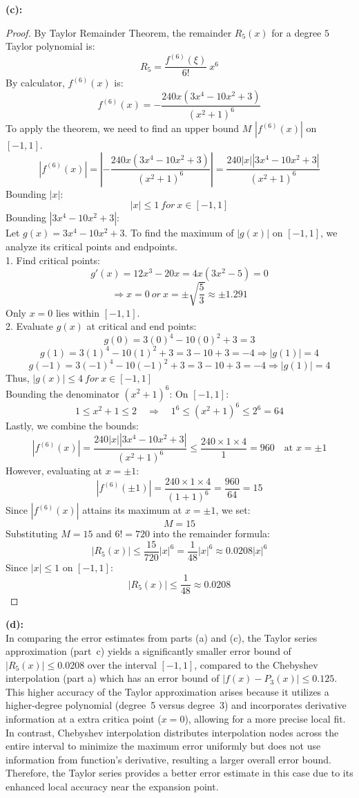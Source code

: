 \documentclass{article}
\begin{document}
\textbf{(c): }
\\
\begin{proof}
By Taylor Remainder Theorem, the remainder $R_{5}(x)$ for a degree $5$ Taylor polynomial is:
\[ R_5 = \frac{f^{(6)}(\xi)}{6!} \ x^6 \]
By calculator, $f^{(6)}(x)$ is:
\[ f^{(6)}(x) = -\frac{240x(3x^4 -10x^2 + 3)}{(x^2 + 1)^6} \]
To apply the theorem, we need to find an upper bound $M$ $|f^{(6)}(x)|$ on $[-1, 1]$.
\[ |f^{(6)}(x)| = \left|-\frac{240x(3x^4 -10x^2 + 3)}{(x^2 + 1)^6} \right| = \frac{240|x||3x^4 -10x^2 + 3|}{(x^2 + 1)^6} \]
Bounding $|x|$: 
\[ |x| \leq 1 \ for \ x \in [-1, 1] \]
Bounding $|3x^4 -10x^2 + 3|$: 
\\
Let $g(x) = 3x^4 - 10x^2 + 3$. To find the maximum of $|g(x)|$ on $[-1,1]$, we analyze its critical points and endpoints.
\\
1. Find critical points:
\[ g'(x) = 12x^3 - 20x = 4x(3x^2 - 5) = 0 \]
\[ \Rightarrow x = 0 \ or \ x = \pm \sqrt{\frac{5}{3}} \approx \pm 1.291 \]
Only $x = 0$ lies within $[-1, 1]$.
\\
2. Evaluate $g(x)$ at critical and end points:
\[ g(0) = 3(0)^4 - 10(0)^2 + 3 = 3 \]
\[ g(1) = 3(1)^4 - 10(1)^2 + 3 = 3 - 10 + 3 = -4 \Rightarrow |g(1)| = 4 \]
\[ g(-1) = 3(-1)^4 - 10(-1)^2 + 3 = 3 - 10 + 3 = -4 \Rightarrow |g(1)| = 4 \]
Thus, \( |g(x)| \leq 4 \ for \ x \in [-1, 1] \)
\\
Bounding the denominator $(x^2 + 1)^6$:
On \([-1,1]\):
\[
1 \leq x^2 + 1 \leq 2 \quad \Rightarrow \quad 1^6 \leq (x^2 + 1)^6 \leq 2^6 = 64
\]
Lastly, we combine the bounds:
\[
|f^{(6)}(x)| = \frac{240|x||3x^4 -10x^2 + 3|}{(x^2 + 1)^6} \leq \frac{240 \times 1 \times 4}{1} = 960 \quad \text{at } x = \pm1
\]
However, evaluating at \( x = \pm1 \):
\[
|f^{(6)}(\pm1)| = \frac{240 \times 1 \times 4}{(1 + 1)^6} = \frac{960}{64} = 15
\]
Since \( |f^{(6)}(x)| \) attains its maximum at \( x = \pm1 \), we set:
\[
M = 15
\]
Substituting \( M = 15 \) and \( 6! = 720 \) into the remainder formula:
\[
|R_5(x)| \leq \frac{15}{720} |x|^6 = \frac{1}{48} |x|^6 \approx 0.0208 |x|^6
\]
Since \( |x| \leq 1 \) on \([-1,1]\):
\[
    |R_5(x)| \leq \frac{1}{48} \approx 0.0208
\]
\end{proof}

\textbf{(d): }
\\
In comparing the error estimates from parts (a) and (c), the Taylor series approximation (part~c) yields a significantly smaller error bound of \( |R_5(x)| \leq 0.0208 \) over the interval \([-1, 1]\), 
compared to the Chebyshev interpolation (part a) which has an error bound of \( |f(x) - P_3(x)| \leq 0.125 \). 
This higher accuracy of the Taylor approximation arises because it utilizes a higher-degree polynomial (degree~5 versus degree~3) and incorporates derivative information at a extra critica point (\(x=0\)), allowing for a more precise local fit. 
In contrast, Chebyshev interpolation distributes interpolation nodes across the entire interval to minimize the maximum error uniformly but does not use information from function's derivative, resulting a larger overall error bound. 
Therefore, the Taylor series provides a better error estimate in this case due to its enhanced local accuracy near the expansion point.
\end{document}
